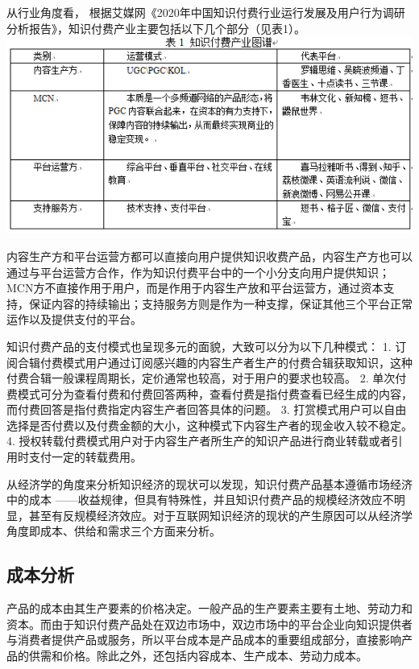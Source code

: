 \documentclass[UTF8,a4paper,12pt]{ctexart}  %
\begin{document}
从行业角度看， 根据艾媒网《2020年中国知识付费行业运行发展及用户行为调研分析报告》，知识付费产业主要包括以下几个部分（见表1）。
\includegraphics{wy1.png}

内容生产方和平台运营方都可以直接向用户提供知识收费产品，内容生产方也可以通过与平台运营方合作，作为知识付费平台中的一个小分支向用户提供知识；MCN方不直接作用于用户，而是作用于内容生产放和平台运营方，通过资本支持，保证内容的持续输出；支持服务方则是作为一种支撑，保证其他三个平台正常运作以及提供支付的平台。

知识付费产品的支付模式也呈现多元的面貌，大致可以分为以下几种模式：
1. 订阅合辑付费模式用户通过订阅感兴趣的内容生产者生产的付费合辑获取知识，这种付费合辑一般课程周期长，定价通常也较高，对于用户的要求也较高。
2. 单次付费模式可分为查看付费和付费回答两种，查看付费是指付费查看已经生成的内容，而付费回答是指付费指定内容生产者回答具体的问题。
3. 打赏模式用户可以自由选择是否付费以及付费金额的大小，这种模式下内容生产者的现金收入较不稳定。
4. 授权转载付费模式用户对于内容生产者所生产的知识产品进行商业转载或者引用时支付一定的转载费用。

从经济学的角度来分析知识经济的现状可以发现，知识付费产品基本遵循市场经济中的成本
------收益规律，但具有特殊性，并且知识付费产品的规模经济效应不明显，甚至有反规模经济效应。对于互联网知识经济的现状的产生原因可以从经济学角度即成本、供给和需求三个方面来分析。

\hypertarget{section-3}{%
\subsection{成本分析}\label{section-3}}

产品的成本由其生产要素的价格决定。一般产品的生产要素主要有土地、劳动力和资本。而由于知识付费产品处在双边市场中，双边市场中的平台企业向知识提供者与消费者提供产品或服务，所以平台成本是产品成本的重要组成部分，直接影响产品的供需和价格。除此之外，还包括内容成本、生产成本、劳动力成本。
\end{document}
